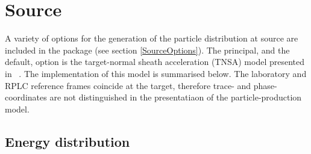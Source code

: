 \graphicspath{ {05-Source/Figures/} }

\section{Source}

A variety of options for the generation of the particle distribution
at source are included in the package (see section \ref{SourceOptions}).
The principal, and the default, option is the target-normal sheath
acceleration (TNSA) model presented in~\cite{10.1038/nphys199} .
The implementation of this model is summarised below.
The laboratory and RPLC reference frames coincide at the target,
therefore trace- and phase-coordinates are not distinguished in the
presentatiaon of the particle-production model.

\subsection{Energy distribution}

